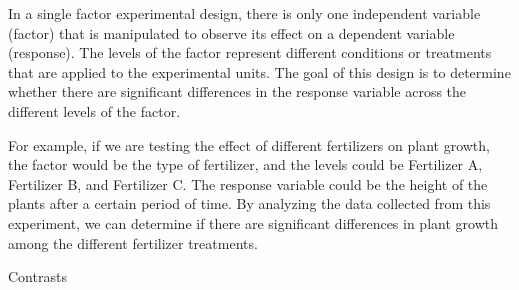 \documentclass[answers,12pt,addpoints]{exam}
\begin{document}
\begin{remark}
    In a single factor experimental design, there is only one independent variable (factor) that is manipulated to observe its effect on a dependent variable (response). The levels of the factor represent different conditions or treatments that are applied to the experimental units. The goal of this design is to determine whether there are significant differences in the response variable across the different levels of the factor.

    For example, if we are testing the effect of different fertilizers on plant growth, the factor would be the type of fertilizer, and the levels could be Fertilizer A, Fertilizer B, and Fertilizer C. The response variable could be the height of the plants after a certain period of time. By analyzing the data collected from this experiment, we can determine if there are significant differences in plant growth among the different fertilizer treatments.
\end{remark}


\begin{questions}
    \question Contrasts
\end{questions}
\end{document}
